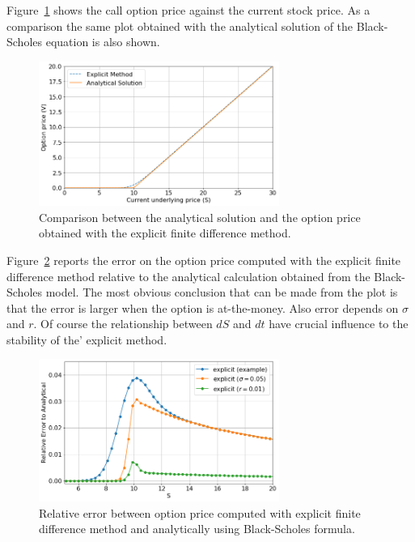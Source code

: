 Figure~\ref{fig:bs_finite_difference} shows the call option price against the current stock price. As a comparison the same plot obtained with the analytical solution of the Black-Scholes equation is also shown. 

\begin{figure}[htb]
	\centering
	\includegraphics[width=0.7\textwidth]{figures/bs_finite_difference}
	\caption{Comparison between the analytical solution and the option price obtained with the explicit finite difference method.}
	\label{fig:bs_finite_difference}
\end{figure} 

Figure~\ref{fig:explicit_relative_error} reports the error on the option price computed with the explicit finite difference method relative to the analytical calculation obtained from the Black-Scholes model. The most obvious conclusion that can be made from the plot is that the error is larger when the option is at-the-money. Also error depends on $\sigma$ and $r$. Of course the relationship between $dS$ and $dt$ have crucial influence to the stability of the' explicit method. 
 
\begin{figure}[htb]
	\centering
	\includegraphics[width=0.7\textwidth]{figures/explicit_relative_error}
	\caption{Relative error between option price computed with explicit finite difference method and analytically using Black-Scholes formula.}
	\label{fig:explicit_relative_error}
\end{figure} 

